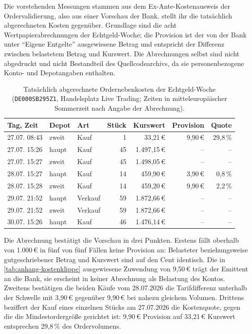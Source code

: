 Die vorstehenden Messungen stammen aus dem Ex-Ante-Kostenausweis der
Ordervalidierung, also aus einer Vorschau der Bank. 
stellt ihr die tatsächlich abgerechneten Kosten gegenüber. Grundlage sind die acht
Wertpapierabrechnungen der Echtgeld-Woche; die Provision ist der von der Bank unter
\enquote{Eigene Entgelte} ausgewiesene Betrag und entspricht der Differenz zwischen
belastetem Betrag und Kurswert. Die Abrechnungen selbst sind nicht abgedruckt und
nicht Bestandteil des Quellcodearchivs, da sie personenbezogene Konto- und
Depotangaben enthalten.

\begin{table}[htbp]
  \centering
  \caption[Abgerechnete Ordernebenkosten der Echtgeld-Woche]{%
    Tatsächlich abgerechnete Ordernebenkosten der Echtgeld-Woche
    (\texttt{DE000SB295Z1}, Handelsplatz Live Trading; Zeiten in
    mitteleuropäischer Sommerzeit nach Angabe der Abrechnung).\quelleeigen}
  \label{tab:anhang-abrechnung}
  \begin{tabular}{l l l r r r r}
    \toprule
    Tag, Zeit & Depot & Art & Stück & Kurswert & Provision & Quote \\
    \midrule
    27.07. 08:43 & zweit & Kauf    &  1 &     33{,}21\,€ & 9{,}90\,€ & 29{,}8\,\% \\
    27.07. 15:26 & haupt & Kauf    & 45 &  1.497{,}15\,€ & --        & --         \\
    27.07. 15:27 & zweit & Kauf    & 45 &  1.498{,}05\,€ & --        & --         \\
    28.07. 15:27 & haupt & Kauf    & 14 &    459{,}90\,€ & 3{,}90\,€ & 0{,}8\,\%  \\
    28.07. 15:28 & zweit & Kauf    & 14 &    459{,}20\,€ & 9{,}90\,€ & 2{,}2\,\%  \\
    29.07. 21:52 & haupt & Verkauf & 59 &  1.872{,}66\,€ & --        & --         \\
    29.07. 21:52 & zweit & Verkauf & 59 &  1.872{,}66\,€ & --        & --         \\
    30.07. 15:26 & haupt & Kauf    & 46 &  1.476{,}14\,€ & --        & --         \\
    \bottomrule
  \end{tabular}
\end{table}

Die Abrechnung bestätigt die Vorschau in drei Punkten. Erstens fällt oberhalb von
1.000\,€ in fünf von fünf Fällen keine Provision an: Belasteter beziehungsweise
gutgeschriebener Betrag und Kurswert sind auf den Cent identisch. Die in
\cref{tab:anhang-kostenklippe} ausgewiesene Zuwendung von 9{,}50\,€ trägt der
Emittent an die Bank, sie erscheint in keiner Abrechnung als Belastung des Kontos.
Zweitens bestätigen die beiden Käufe vom 28.07.2026 die Tarifdifferenz unterhalb
der Schwelle mit 3{,}90\,€ gegenüber 9{,}90\,€ bei nahezu gleichem Volumen.
Drittens beziffert der Kauf eines einzelnen Stücks am 27.07.2026 die Kostenquote,
gegen die die Mindestordergröße gerichtet ist: 9{,}90\,€ Provision auf 33{,}21\,€
Kurswert entsprechen 29{,}8\,\% des Ordervolumens.

